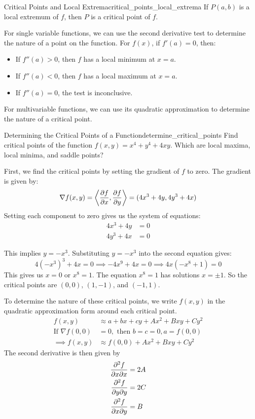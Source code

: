 \begin{theorem}{Critical Points and Local Extrema}{critical_points_local_extrema}
If $P(a, b)$ is a local extremum of $f$, then $P$ is a critical point of $f$.
\end{theorem}

For single variable functions, we can use the second derivative test to determine the nature of a point on the function.
For $f(x)$, if $f'(a) = 0$, then:
\begin{itemize}
    \item If $f''(a) > 0$, then $f$ has a local minimum at $x = a$.
    \item If $f''(a) < 0$, then $f$ has a local maximum at $x = a$.
    \item If $f''(a) = 0$, the test is inconclusive.
\end{itemize}

For multivariable functions, we can use its quadratic approximation to determine the nature of a critical point.

\begin{problem}{Determining the Critical Points of a Function}{determine_critical_points}
Find critical points of the function $f(x, y) = x^4 + y^4 + 4xy$. Which are local maxima, local minima, and saddle points?
\end{problem}

\begin{sol}
First, we find the critical points by setting the gradient of $f$ to zero. The gradient is given by:
\[
\nabla f(x, y) = \left\langle \pdv{f}{x}, \pdv{f}{y} \right\rangle = (4x^3 + 4y, 4y^3 + 4x)
\]
Setting each component to zero gives us the system of equations:
\begin{align*}
4x^3 + 4y &= 0 \\
4y^3 + 4x &= 0
\end{align*}

This implies $y = -x^3$. Substituting $y = -x^3$ into the second equation gives:
\[
4(-x^3)^3 + 4x = 0 \implies -4x^9 + 4x = 0 \implies 4x(-x^8 + 1) = 0
\]
This gives us $x = 0$ or $x^8 = 1$. The equation $x^8 = 1$ has solutions $x = \pm 1$. So the critical points are $(0, 0)$, $(1, -1)$, and $(-1, 1)$.

To determine the nature of these critical points, we write $f(x, y)$ in the quadratic approximation form around each critical point.
\begin{align*}
f(x, y) &\approx a + bx + cy + Ax^2 + Bxy + Cy^2 \\
\text{If } \nabla f(0, 0) &= 0, \text{ then } b = c = 0, a = f(0, 0) \\
\implies f(x, y) &\approx f(0, 0) + Ax^2 + Bxy + Cy^2
\end{align*}
The second derivative is then given by
\begin{align*}
\pdv{f}{x}{x} &= 2A \\
\pdv{f}{y}{y} &= 2C \\
\pdv{f}{x}{y} &= B
\end{align*}
\end{sol}

